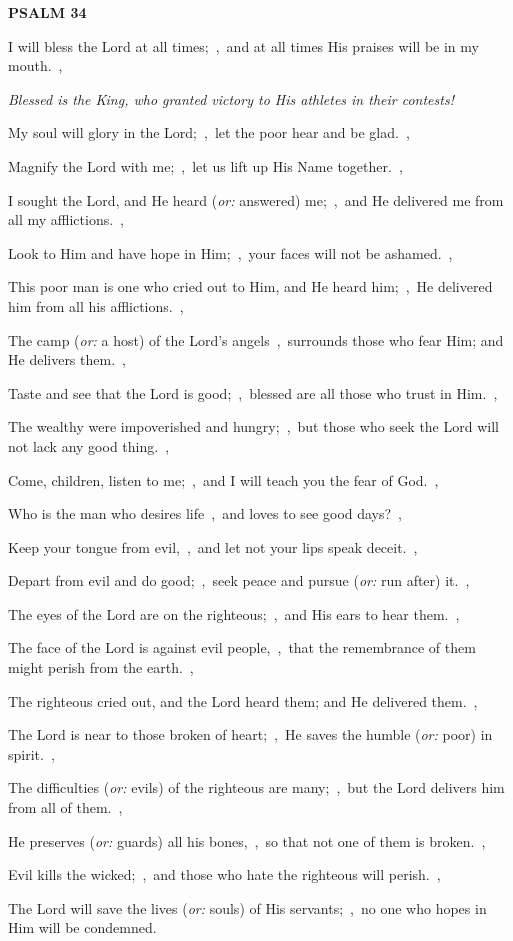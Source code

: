 \documentclass[12pt,twoside,a5paper]{article}
\newcommand{\psalm}[1]{\textbf{PSALM {#1}}\nopagebreak}
\newcommand{\qanona}[1]{{\liturgicalhint{Qanona.} \emph{#1}}}
\newcommand{\translationoption}[1]{\emph{or:} #1}
\begin{document}
\psalm{34}

\begin{normalparskip}
  I will bless the Lord at all times;~\sep\ and at all times His praises will be in my mouth.~\sep

  \qanona{Blessed is the King, who granted victory to His athletes in their contests!}

  My soul will glory in the Lord;~\sep\ let the poor hear and be glad.~\sep

  Magnify the Lord with me;~\sep\ let us lift up His Name together.~\sep

  I sought the Lord, and He heard (\translationoption{answered}) me;~\sep\ and He delivered me from all my afflictions.~\sep

  Look to Him and have hope in Him;~\sep\ your faces will not be ashamed.~\sep

  This poor man is one who cried out to Him, and He heard him;~\sep\ He delivered him from all his afflictions.~\sep

  The camp (\translationoption{a host}) of the Lord's angels~\sep\ surrounds those who fear Him; and He delivers them.~\sep

  Taste and see that the Lord is good;~\sep\ blessed are all those who trust in Him.~\sep

  The wealthy were impoverished and hungry;~\sep\ but those who seek the Lord will not lack any good thing.~\sep

  Come, children, listen to me;~\sep\ and I will teach you the fear of God.~\sep

  Who is the man who desires life~\sep\ and loves to see good days?~\sep

  Keep your tongue from evil,~\sep\ and let not your lips speak deceit.~\sep

  Depart from evil and do good;~\sep\ seek peace and pursue (\translationoption{run after}) it.~\sep

  The eyes of the Lord are on the righteous;~\sep\ and His ears to hear them.~\sep

  The face of the Lord is against evil people,~\sep\ that the remembrance of them might perish from the earth.~\sep

  The righteous cried out, and the Lord heard them; and He delivered them.~\sep

  The Lord is near to those broken of heart;~\sep\ He saves the humble (\translationoption{poor}) in spirit.~\sep

  The difficulties (\translationoption{evils}) of the righteous are many;~\sep\ but the Lord delivers him from all of them.~\sep

  He preserves (\translationoption{guards}) all his bones,~\sep\ so that not one of them is broken.~\sep

  Evil kills the wicked;~\sep\ and those who hate the righteous will perish.~\sep

  The Lord will save the lives (\translationoption{souls}) of His servants;~\sep\ no one who hopes in Him will be condemned.
\end{normalparskip}
\end{document}
